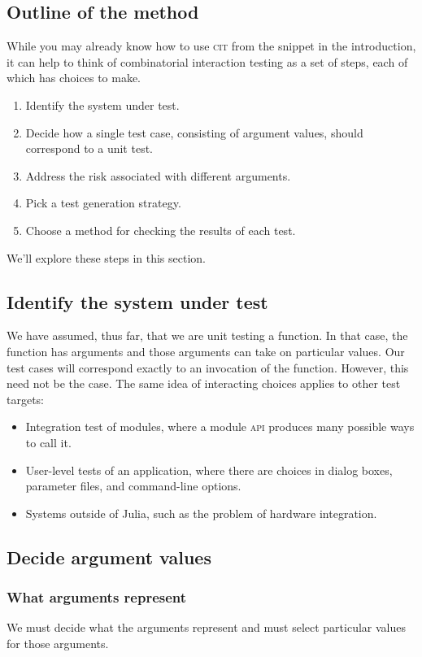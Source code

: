 \documentclass{juliacon}
\newcommand{\cit}{\textsc{cit}\xspace}
\begin{document}
\subsection{Outline of the method}

While you may already know how to use \cit from the snippet in the introduction, it can help to think of combinatorial interaction testing as a set of steps, each of which has choices to make.
\begin{enumerate}
   \item Identify the system under test.
   \item Decide how a single test case, consisting of argument values, should correspond to a unit test.
   \item Address the risk associated with different arguments.
   \item Pick a test generation strategy.
   \item Choose a method for checking the results of each test.
\end{enumerate}
We'll explore these steps in this section.

\subsection{Identify the system under test}

We have assumed, thus far, that we are unit testing a function. In that case, the function has arguments and those arguments can take on particular values. Our test cases will correspond exactly to an invocation of the function. However, this need not be the case. The same idea of interacting choices applies to other test targets:

\begin{itemize}
\item Integration test of modules, where a module \textsc{api} produces many possible ways to call it.
\item User-level tests of an application, where there are choices in dialog boxes, parameter files, and command-line options.
\item Systems outside of Julia, such as the problem of hardware integration.
\end{itemize}

\subsection{Decide argument values}

\subsubsection{What arguments represent}
We must decide what the arguments represent and must select particular values for those arguments.
\end{document}
